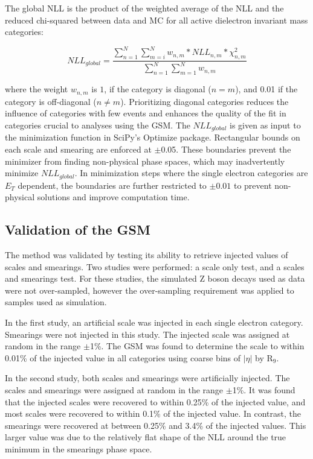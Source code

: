The global NLL is the product of the weighted average of the NLL and the reduced chi-squared between data and MC for all active dielectron invariant mass categories:

\begin{equation}
    NLL_{global} = \frac{\sum_{n=1}^{N}\sum_{m=i}^{N} w_{n,m} * NLL_{n,m} * \chi^{2}_{n,m}}{ \sum_{n=1}^{N}\sum_{m=1}^{N} w_{n,m}}
    \label{eqn:global_target}
\end{equation}

\noindent where the weight $w_{n,m}$ is $1$, if the category is diagonal ($n = m$), and 0.01 if the category is off-diagonal ($n \neq m$). Prioritizing diagonal categories reduces the influence of categories with few events and enhances the quality of the fit in categories crucial to analyses using the GSM. The $NLL_{global}$ is given as input to the minimization function in SciPy's Optimize package. Rectangular bounds on each scale and smearing are enforced at $\pm$0.05. These boundaries prevent the minimizer from finding non-physical phase spaces, which may inadvertently minimize $NLL_{global}$. In minimization steps where the single electron categories are $E_T$ dependent, the boundaries are further restricted to $\pm0.01$ to prevent non-physical solutions and improve computation time.

\subsection{Validation of the GSM}

The method was validated by testing its ability to retrieve injected values of scales and smearings. Two studies were performed: a scale only test, and a scales and smearings test. For these studies, the simulated Z boson decays used as data were not over-sampled, however the over-sampling requirement was applied to samples used as simulation.

In the first study, an artificial scale was injected in each single electron category. Smearings were not injected in this study. The injected scale was assigned at random in the range $\pm$1\%. The GSM was found to determine the scale to within 0.01\% of the injected value in all categories using coarse bins of $|\eta|$ by R$_9$.

In the second study, both scales and smearings were artificially injected. The scales and smearings were assigned at random in the range $\pm$1\%. It was found that the injected scales were recovered to within 0.25\% of the injected value, and most scales were recovered to within 0.1\% of the injected value. In contrast, the smearings were recovered at between 0.25\% and 3.4\% of the injected values. This larger value was due to the relatively flat shape of the NLL around the true minimum in the smearings phase space.


